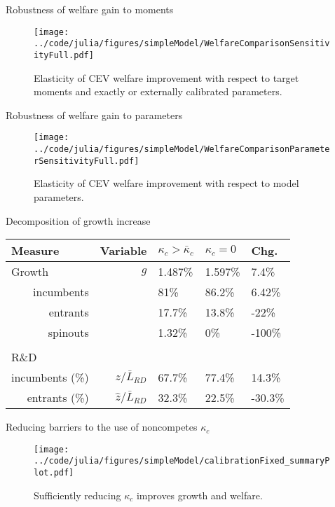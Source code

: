 \documentclass[english,usenames,dvipsnames,handout]{beamer}
\begin{document}
\begin{frame}{Robustness of welfare gain to moments}\label{robustness_to_moments}
\hyperlink{reducing_kappa_c_table}{}
	\begin{figure}
		\texttt{[image: ../code/julia/figures/simpleModel/WelfareComparisonSensitivityFull.pdf]}
		\caption{Elasticity of CEV welfare improvement with respect to target moments and exactly or externally calibrated parameters.}
		\label{WelfareComparisonSensitivityFull}
	\end{figure}
\end{frame}

\begin{frame}{Robustness of welfare gain to parameters}\label{robustness_to_parameters}
	\hyperlink{reducing_kappa_c_table}{}
	\begin{figure}
		\texttt{[image: ../code/julia/figures/simpleModel/WelfareComparisonParameterSensitivityFull.pdf]}
		\caption{Elasticity of CEV welfare improvement with respect to model parameters.}
		\label{WelfareComparisonSensitivityFull}
	\end{figure}
\end{frame}

\begin{frame}{Decomposition of growth increase}\label{decomposition_growth_increase}
	\hyperlink{reducing_kappa_c_table}{}
	\begin{table}
		\centering
		\footnotesize
		\begin{tabular}{lrlll}
			\toprule \toprule
			Measure & Variable & $\kappa_c > \bar{\kappa}_c$ & $\kappa_c = 0$ & Chg. \tabularnewline
			\midrule
			Growth & $g$ & 1.487\% & 1.597\% & 7.4\% \tabularnewline
			\multicolumn{1}{r}{incumbents} &  & 81\% & 86.2\% & 6.42\% \tabularnewline
			\multicolumn{1}{r}{entrants} &  & 17.7\% & 13.8\% & -22\% \tabularnewline
			\multicolumn{1}{r}{spinouts} &  & 1.32\% & 0\% & -100\% \tabularnewline
			\tabularnewline
			R\&D & & & & 
			\tabularnewline
			\multicolumn{1}{r}{incumbents (\%)}  & $z / \bar{L}_{RD}$ & 67.7\% & 77.4\% & 14.3\% \tabularnewline 
			
			\multicolumn{1}{r}{entrants (\%)}  & $\hat{z} / \bar{L}_{RD}$ & 32.3\% & 22.5\% & -30.3\% \tabularnewline
			\bottomrule
		\end{tabular}
	\end{table}
\end{frame}


\begin{frame}{Reducing barriers to the use of noncompetes $\kappa_c$} \label{reducing_kappa_c} 
	\hyperlink{reducing_kappa_c_table}{}
	\begin{figure}[]
		\texttt{[image: ../code/julia/figures/simpleModel/calibrationFixed\_summaryPlot.pdf]}
		\caption{Sufficiently reducing $\kappa_c$ improves growth and welfare.}
	\end{figure}
\end{frame}
\end{document}
